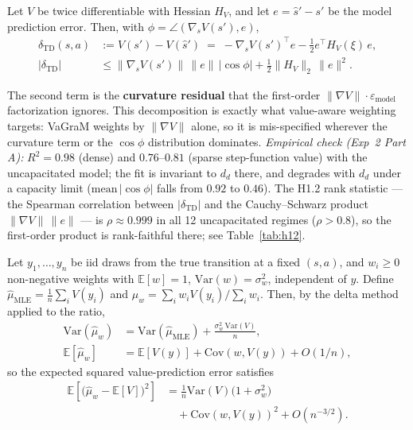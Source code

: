 \documentclass{article}
\theoremstyle{plain}
\begin{document}
\begin{lemma}[decomposition]
\label{lem:decomp}
Let $V$ be twice differentiable with Hessian $H_V$, and let $e = \hat{s}' - s'$ be the
model prediction error. Then, with $\phi = \angle(\nabla_s V(s'), e)$,
\begin{align}
  \delta_{\mathrm{TD}}(s,a) &:= V(s') - V(\hat{s}') 
    \;=\; - \nabla_s V(s')^{\top} e - \tfrac{1}{2} e^{\top} H_V(\xi)\, e, \\
  \lvert \delta_{\mathrm{TD}} \rvert
    &\le \lVert \nabla_s V(s')\rVert\, \lVert e\rVert\, \lvert\cos\phi\rvert
       + \tfrac{1}{2} \lVert H_V \rVert_2\, \lVert e\rVert^2.
\end{align}
\end{lemma}

The second term is the \textbf{curvature residual} that the first-order
$\lVert \nabla V\rVert \cdot \varepsilon_{\mathrm{model}}$ factorization ignores. This
decomposition is exactly what value-aware weighting targets: VaGraM weights by
$\lVert \nabla V\rVert$ alone, so it is mis-specified wherever the curvature term or the
$\cos\phi$ distribution dominates. \emph{Empirical check (Exp~2 Part A):}
$R^2 = 0.98$ (dense) and $0.76$--$0.81$ (sparse step-function value) with the
uncapacitated model; the fit is invariant to $d_d$ there, and degrades with $d_d$ under
a capacity limit ($\mathrm{mean}\,\lvert\cos\phi\rvert$ falls from $0.92$ to $0.46$).
The H1.2 rank statistic --- the Spearman correlation between $\lvert\delta_{\mathrm{TD}}\rvert$
and the Cauchy--Schwarz product $\lVert\nabla V\rVert\,\lVert e\rVert$ --- is
$\rho \approx 0.999$ in all 12 uncapacitated regimes ($\rho > 0.8$), so the first-order
product is rank-faithful there; see Table~\ref{tab:h12}.

\begin{theorem}
\label{thm:pred}
Let $y_1, \dots, y_n$ be iid draws from the true transition at a fixed $(s,a)$, and
$w_i \ge 0$ non-negative weights with $\mathbb{E}[w] = 1$, $\mathrm{Var}(w) = \sigma_w^2$,
independent of $y$. Define $\hat{\mu}_{\mathrm{MLE}} = \frac{1}{n}\sum_i V(y_i)$ and
$\hat{\mu}_w = \sum_i w_i V(y_i) / \sum_i w_i$. Then, by the delta method applied to the
ratio,
\begin{align}
  \mathrm{Var}(\hat{\mu}_w) &= \mathrm{Var}(\hat{\mu}_{\mathrm{MLE}})
    + \frac{\sigma_w^2\, \mathrm{Var}(V)}{n}, \\
  \mathbb{E}[\hat{\mu}_w] &= \mathbb{E}[V(y)] + \mathrm{Cov}(w, V(y)) + O(1/n),
\end{align}
so the expected squared value-prediction error satisfies
\begin{equation}
\begin{aligned}
  \mathbb{E}\!\left[\bigl(\hat{\mu}_w - \mathbb{E}[V]\bigr)^2\right]
  &= \frac{1}{n}\mathrm{Var}(V)\bigl(1 + \sigma_w^2\bigr) \\
  &\quad + \mathrm{Cov}(w, V(y))^2 + O(n^{-3/2}).
\end{aligned}
\end{equation}
\end{theorem}
\end{document}

